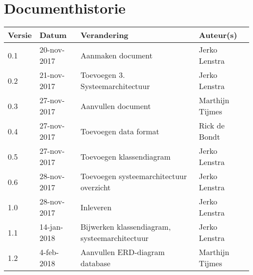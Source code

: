 \section{Documenthistorie}

\begin{tabularx}{\textwidth}{| l | l | X | l |}
	\hline
	\textbf{Versie} & \textbf{Datum} & \textbf{Verandering} & \textbf{Auteur(s)} \\ \hline
	0.1	& 20-nov-2017 & Aanmaken document & Jerko Lenstra \\ \hline
    0.2 & 21-nov-2017 & Toevoegen 3. Systeemarchitectuur & Jerko Lenstra \\ \hline
    0.3 & 27-nov-2017 & Aanvullen document & Marthijn Tijmes \\ \hline
    0.4 & 27-nov-2017 & Toevoegen data format & Rick de Bondt \\ \hline
    0.5 & 27-nov-2017 & Toevoegen klassendiagram & Jerko Lenstra \\ \hline
    0.6 & 28-nov-2017 & Toevoegen systeemarchitectuur overzicht & Jerko Lenstra \\ \hline
    1.0 & 28-nov-2017 & Inleveren & Jerko Lenstra \\ \hline
    1.1 & 14-jan-2018 & Bijwerken klassendiagram, systeemarchitectuur & Jerko Lenstra \\ \hline
    1.2 & 4-feb-2018 & Aanvullen ERD-diagram database & Marthijn Tijmes \\ \hline

\end{tabularx}
